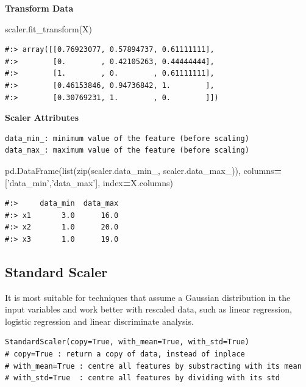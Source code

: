 \documentclass[
]{book}
\newenvironment{Shaded}{\begin{snugshade}}{\end{snugshade}}
\newcommand{\BuiltInTok}[1]{#1}
\newcommand{\NormalTok}[1]{#1}
\newcommand{\OperatorTok}[1]{\textcolor[rgb]{0.43,0.43,0.43}{\textbf{#1}}}
\newcommand{\StringTok}[1]{\textcolor[rgb]{0.5,0.5,0.5}{#1}}
\begin{document}
\textbf{Transform Data}

\begin{Shaded}
\begin{Highlighting}[]
\NormalTok{scaler.fit_transform(X)}
\end{Highlighting}
\end{Shaded}

\begin{verbatim}
#:> array([[0.76923077, 0.57894737, 0.61111111],
#:>        [0.        , 0.42105263, 0.44444444],
#:>        [1.        , 0.        , 0.61111111],
#:>        [0.46153846, 0.94736842, 1.        ],
#:>        [0.30769231, 1.        , 0.        ]])
\end{verbatim}

\textbf{Scaler Attributes}

\begin{verbatim}
data_min_: minimum value of the feature (before scaling)  
data_max_: maximum value of the feature (before scaling)  
\end{verbatim}

\begin{Shaded}
\begin{Highlighting}[]
\NormalTok{pd.DataFrame(}\BuiltInTok{list}\NormalTok{(}\BuiltInTok{zip}\NormalTok{(scaler.data_min_, scaler.data_max_)), }
\NormalTok{             columns}\OperatorTok{=}\NormalTok{[}\StringTok{'data_min'}\NormalTok{,}\StringTok{'data_max'}\NormalTok{], }
\NormalTok{             index}\OperatorTok{=}\NormalTok{X.columns)}
\end{Highlighting}
\end{Shaded}

\begin{verbatim}
#:>     data_min  data_max
#:> x1       3.0      16.0
#:> x2       1.0      20.0
#:> x3       1.0      19.0
\end{verbatim}

\hypertarget{standard-scaler}{%
\subsection{Standard Scaler}\label{standard-scaler}}

It is most suitable for techniques that assume a Gaussian distribution in the input variables and work better with rescaled data, such as linear regression, logistic regression and linear discriminate analysis.

\begin{verbatim}
StandardScaler(copy=True, with_mean=True, with_std=True)
# copy=True : return a copy of data, instead of inplace
# with_mean=True : centre all features by substracting with its mean
# with_std=True  : centre all features by dividing with its std
\end{verbatim}
\end{document}
